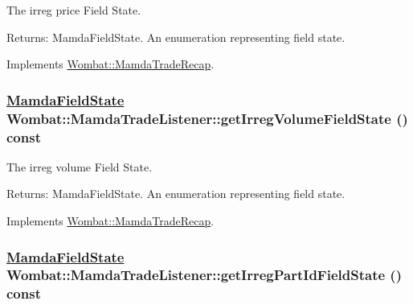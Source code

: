 The irreg price Field State. 

\begin{Desc}
\item[Returns:]Mamda\-Field\-State. An enumeration representing field state. \end{Desc}


Implements \hyperlink{classWombat_1_1MamdaTradeRecap_1d1057e7954bcab91c82c327944b622d}{Wombat::Mamda\-Trade\-Recap}.\hypertarget{classWombat_1_1MamdaTradeListener_8e6b4c395a5dcebe1439553445f5f374}{
\subsubsection[getIrregVolumeFieldState]{\setlength{\rightskip}{0pt plus 5cm}\hyperlink{namespaceWombat_93aac974f2ab713554fd12a1fa3b7d2a}{Mamda\-Field\-State} Wombat::Mamda\-Trade\-Listener::get\-Irreg\-Volume\-Field\-State () const}}
\label{classWombat_1_1MamdaTradeListener_8e6b4c395a5dcebe1439553445f5f374}


The irreg volume Field State. 

\begin{Desc}
\item[Returns:]Mamda\-Field\-State. An enumeration representing field state. \end{Desc}


Implements \hyperlink{classWombat_1_1MamdaTradeRecap_b6b5d24579ced7928a72bb76518e10fa}{Wombat::Mamda\-Trade\-Recap}.\hypertarget{classWombat_1_1MamdaTradeListener_c0c46a4f597942f1256906de3aae3c4c}{
\subsubsection[getIrregPartIdFieldState]{\setlength{\rightskip}{0pt plus 5cm}\hyperlink{namespaceWombat_93aac974f2ab713554fd12a1fa3b7d2a}{Mamda\-Field\-State} Wombat::Mamda\-Trade\-Listener::get\-Irreg\-Part\-Id\-Field\-State () const}}
\label{classWombat_1_1MamdaTradeListener_c0c46a4f597942f1256906de3aae3c4c}



